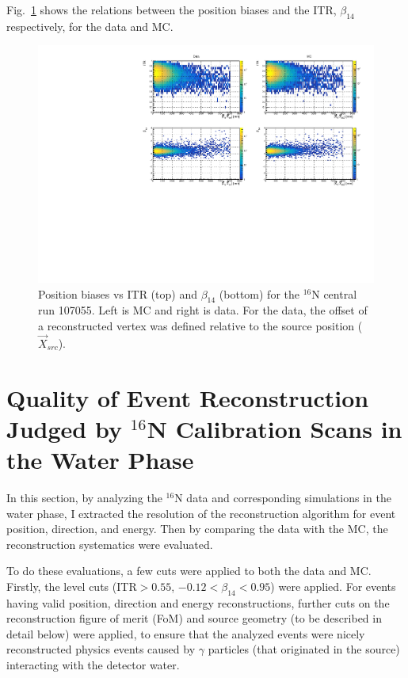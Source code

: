 Fig.~\ref{n16_highLevelCut} shows the relations between the position biases and the ITR, $\beta_{14}$ respectively, for the data and MC.
\begin{figure}
	\centering
	\includegraphics[width=14cm]{N16_107055_highLevelCuts.pdf}
	\caption[Position biases vs ITR and $\beta_{14}$ for the $^{16}$N central run 107055.]{Position biases vs ITR (top) and $\beta_{14}$ (bottom) for the $^{16}$N central run 107055. Left is MC and right is data. For the data, the offset of a reconstructed vertex was defined relative to the source position ($\vec{X}_{src}$). \label{n16_highLevelCut}}
\end{figure}


\section{Quality of Event Reconstruction Judged by $^{16}$N Calibration Scans in the Water Phase}

In this section, by analyzing the $^{16}$N data and corresponding simulations in the water phase, I extracted the resolution of the reconstruction algorithm for event position, direction, and energy. Then by comparing the data with the MC, the reconstruction systematics were evaluated.

To do these evaluations, a few cuts were applied to both the data and MC. Firstly, the level cuts (ITR$>0.55$, $-0.12<\beta_{14}<0.95$) were applied. For events having valid position, direction and energy reconstructions, further cuts on the reconstruction figure of merit (FoM) and source geometry (to be described in detail below) were applied, to ensure that the analyzed events were nicely reconstructed physics events caused by $\gamma$ particles (that originated in the source) interacting with the detector water.

